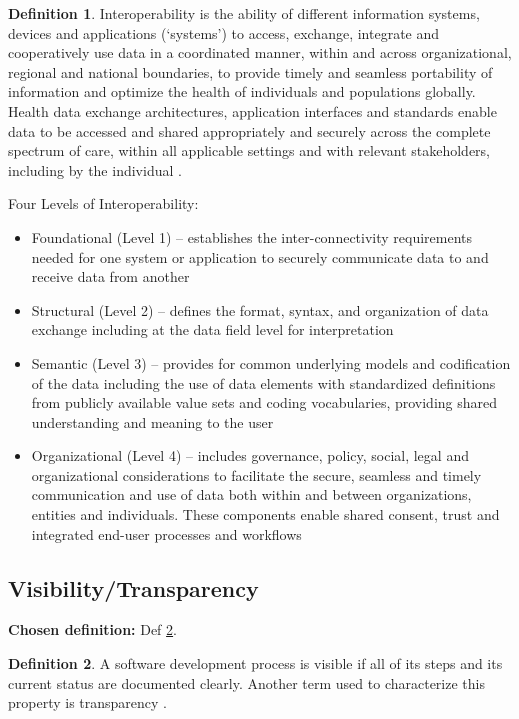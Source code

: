 \documentclass[letterpaper,cleveref]{lipics-v2019}
\theoremstyle{definition}
\newtheorem{defn}{Definition}
\begin{document}
\begin{defn}
\label{InteroperabilitySelected}
Interoperability is the ability of different information systems, devices and applications (‘systems’) to access, exchange, integrate and cooperatively use data in a coordinated manner, within and across organizational, regional and national boundaries, to provide timely and seamless portability of information and optimize the health of individuals and populations globally. Health data exchange architectures, application interfaces and standards enable data to be accessed and shared appropriately and securely across the complete spectrum of care, within all applicable settings and with relevant stakeholders, including by the individual \citep{HIMSS2019}.
        
Four Levels of Interoperability:
\begin{itemize}
\item Foundational (Level 1) – establishes the inter-connectivity requirements needed for one system or application to securely communicate data to and receive data from another

\item Structural (Level 2) – defines the format, syntax, and organization of data exchange including at the data field level for interpretation

\item Semantic (Level 3) – provides for common underlying models and codification of the data including the use of data elements with standardized definitions from publicly available value sets and coding vocabularies, providing shared understanding and meaning to the user

\item Organizational (Level 4) – includes governance, policy, social, legal and organizational considerations to facilitate the secure, seamless and timely communication and use of data both within and between organizations, entities and individuals. These components enable shared consent, trust and integrated end-user processes and workflows
\end{itemize}
\end{defn}

\subsection{Visibility/Transparency}
\noindent \textbf{Chosen definition:} Def \ref{VisibilitySelected}.

\begin{defn}
\label{VisibilitySelected}
A software development process is visible if all of its steps and its current status are documented clearly. Another term used to characterize this property is transparency \citep{ghezzi1991fundamentals}.
\end{defn}
      
\end{document}
